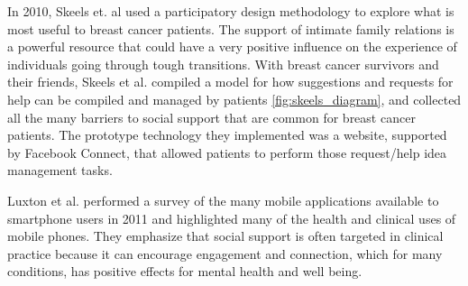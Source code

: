     In 2010, Skeels et. al used a participatory design methodology to explore what is most useful
    to breast cancer patients.
    The support of intimate family relations is a powerful
    resource that could
    have a very positive influence on the experience of individuals going through
    tough transitions.
    With breast cancer survivors and their friends, Skeels et al. compiled a model for how
    suggestions and requests for help can be compiled and managed by patients \ref{fig:skeels_diagram},
    and collected all the many barriers to social support that are common for breast cancer patients.
    The prototype technology they implemented was a website, supported by Facebook Connect,
    that allowed patients to perform those request/help idea management tasks.

    Luxton et al. performed a survey of the many mobile applications available
    to smartphone users in 2011 and
    highlighted many of the health and clinical uses of mobile phones.
    They emphasize that social support is often targeted in clinical practice because
    it can encourage engagement and connection,
    which for many conditions, has positive effects for mental health and well being.
    \cite{luxton11}
